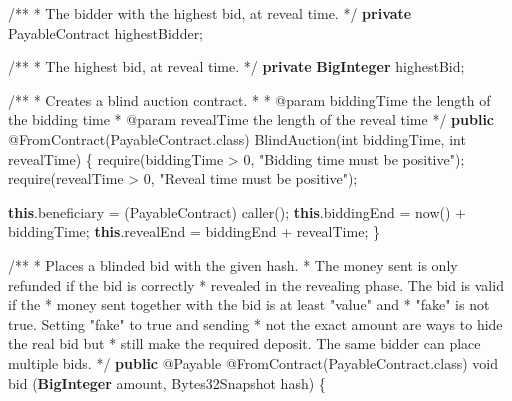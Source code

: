 \documentclass[a4paper,]{book}
\newenvironment{Shaded}{\begin{snugshade}}{\end{snugshade}}
\newcommand{\AnnotationTok}[1]{\textcolor[rgb]{0.79,0.38,0.79}{#1}}
\newcommand{\AttributeTok}[1]{\textcolor[rgb]{0.00,0.34,0.68}{#1}}
\newcommand{\BuiltInTok}[1]{\textcolor[rgb]{0.39,0.29,0.61}{\textbf{#1}}}
\newcommand{\CommentTok}[1]{\textcolor[rgb]{0.54,0.53,0.53}{#1}}
\newcommand{\DataTypeTok}[1]{\textcolor[rgb]{0.00,0.34,0.68}{#1}}
\newcommand{\DecValTok}[1]{\textcolor[rgb]{0.69,0.50,0.00}{#1}}
\newcommand{\FunctionTok}[1]{\textcolor[rgb]{0.39,0.29,0.61}{#1}}
\newcommand{\KeywordTok}[1]{\textcolor[rgb]{0.12,0.11,0.11}{\textbf{#1}}}
\newcommand{\NormalTok}[1]{\textcolor[rgb]{0.12,0.11,0.11}{#1}}
\newcommand{\StringTok}[1]{\textcolor[rgb]{0.75,0.01,0.01}{#1}}
\renewenvironment{Shaded}{\begin{snugshade}\small}{\end{snugshade}}
\begin{document}
{\begin{Shaded}
\begin{Highlighting}[]
  \CommentTok{/**}
   \CommentTok{*}\NormalTok{ The bidder with the highest bid}\CommentTok{,}\NormalTok{ at reveal time}\CommentTok{.}
   \CommentTok{*/}
  \KeywordTok{private}\NormalTok{ PayableContract highestBidder;}

  \CommentTok{/**}
   \CommentTok{*}\NormalTok{ The highest bid}\CommentTok{,}\NormalTok{ at reveal time}\CommentTok{.}
   \CommentTok{*/}
  \KeywordTok{private} \BuiltInTok{BigInteger}\NormalTok{ highestBid;}

  \CommentTok{/**}
   \CommentTok{*}\NormalTok{ Creates a blind auction contract}\CommentTok{.}
   \CommentTok{*} 
   \CommentTok{*} \AnnotationTok{@param biddingTime }\NormalTok{the length of the bidding time}
   \CommentTok{*} \AnnotationTok{@param revealTime }\NormalTok{the length of the reveal time}
   \CommentTok{*/}
  \KeywordTok{public} \AttributeTok{@FromContract}\NormalTok{(PayableContract.}\FunctionTok{class}\NormalTok{) }\FunctionTok{BlindAuction}\NormalTok{(}\DataTypeTok{int}\NormalTok{ biddingTime, }\DataTypeTok{int}\NormalTok{ revealTime) \{}
    \FunctionTok{require}\NormalTok{(biddingTime > }\DecValTok{0}\NormalTok{, }\StringTok{"Bidding time must be positive"}\NormalTok{);}
    \FunctionTok{require}\NormalTok{(revealTime > }\DecValTok{0}\NormalTok{, }\StringTok{"Reveal time must be positive"}\NormalTok{);}

    \KeywordTok{this}\NormalTok{.}\FunctionTok{beneficiary}\NormalTok{ = (PayableContract) }\FunctionTok{caller}\NormalTok{();}
    \KeywordTok{this}\NormalTok{.}\FunctionTok{biddingEnd}\NormalTok{ = }\FunctionTok{now}\NormalTok{() + biddingTime;}
    \KeywordTok{this}\NormalTok{.}\FunctionTok{revealEnd}\NormalTok{ = biddingEnd + revealTime;}
\NormalTok{  \}}

  \CommentTok{/**}
   \CommentTok{*}\NormalTok{ Places a blinded bid with the given hash}\CommentTok{.}
   \CommentTok{*}\NormalTok{ The money sent is only refunded if the bid is correctly}
   \CommentTok{*}\NormalTok{ revealed in the revealing phase}\CommentTok{.}\NormalTok{ The bid is valid if the}
   \CommentTok{*}\NormalTok{ money sent together with the bid is at least }\CommentTok{"}\NormalTok{value}\CommentTok{"}\NormalTok{ and}
   \CommentTok{*} \CommentTok{"}\NormalTok{fake}\CommentTok{"}\NormalTok{ is not true}\CommentTok{.}\NormalTok{ Setting }\CommentTok{"}\NormalTok{fake}\CommentTok{"}\NormalTok{ to true and sending}
   \CommentTok{*}\NormalTok{ not the exact amount are ways to hide the real bid but}
   \CommentTok{*}\NormalTok{ still make the required deposit}\CommentTok{.}\NormalTok{ The same bidder can place multiple bids}\CommentTok{.}
   \CommentTok{*/}
  \KeywordTok{public} \AttributeTok{@Payable} \AttributeTok{@FromContract}\NormalTok{(PayableContract.}\FunctionTok{class}\NormalTok{) }\DataTypeTok{void}\NormalTok{ bid}
\NormalTok{      (}\BuiltInTok{BigInteger}\NormalTok{ amount, Bytes32Snapshot hash) \{}


\end{Highlighting}
\end{Shaded}}
\end{document}
